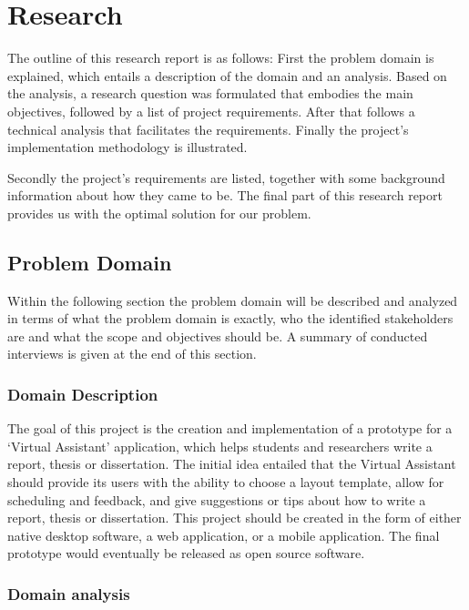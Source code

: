 \chapter{Research}

The outline of this research report is as follows: First the problem domain is explained, which entails a description of the domain and an analysis. Based on the analysis, a research question was formulated that embodies the main objectives, followed by a list of project requirements. After that follows a technical analysis that facilitates the requirements. Finally the project's implementation methodology is illustrated.

Secondly the project's requirements are listed, together with some background information about how they came to be. The final part of this research report provides us with the optimal solution for our problem.


\section{Problem Domain} %
\label{sec:problem_domain}


Within the following section the problem domain will be described and analyzed in terms of what the problem domain is exactly, who the identified stakeholders are and what the scope and objectives should be. A summary of conducted interviews is given at the end of this section.

\subsection{Domain Description} %
\label{sub:problem_description}

The goal of this project is the creation and implementation of a prototype for a `Virtual Assistant' application, which helps students and researchers write a report, thesis or dissertation. The initial idea entailed that the Virtual Assistant should provide its users with the ability to choose a layout template, allow for scheduling and feedback, and give suggestions or tips about how to write a report, thesis or dissertation. This project should be created in the form of either native desktop software, a web application, or a mobile application. The final prototype would eventually be released as open source software.

\subsection{Domain analysis} %


